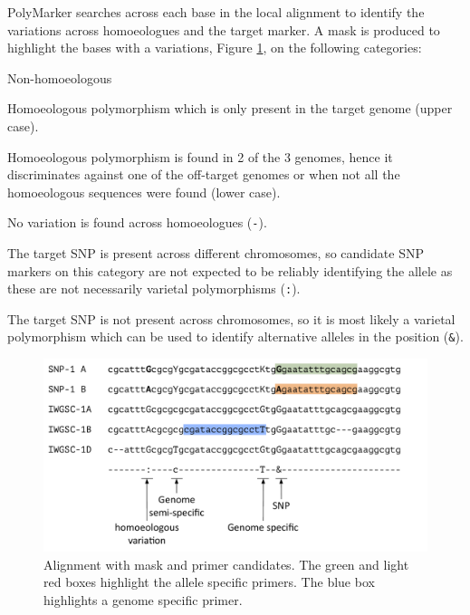 PolyMarker searches across each base in the local alignment to identify the variations across homoeologues and the target marker.
A mask is produced to highlight the bases with a variations, Figure \ref{fig:poly:mask}, on the following categories:
\begin{labeling}{Non-homoeologous}
\item [Specific] Homoeologous polymorphism which is only present in the target genome (upper case).
\item [Semi-specific] Homoeologous polymorphism is found in 2 of the 3 genomes, hence it discriminates against one of the off-target genomes or when not all the homoeologous sequences were found (lower case).
\item [Non-specific] No variation is found across homoeologues (\texttt{-}).
\item [Homoeologous] The target SNP is present across different chromosomes, so candidate SNP markers on this category are not expected to be reliably identifying the allele as these are not necessarily varietal polymorphisms (\texttt{:}).
\item [Non-homoeologous] The target SNP is not present across chromosomes, so it is most likely a varietal polymorphism which can be used to identify alternative alleles in the position (\texttt{\&}).
\end{labeling} 


\begin{figure}
\includegraphics[width=1\textwidth]{PolyMarker/Figures/aln/mask.pdf}
\caption[Alignment with mask and primer candidates.]{Alignment with mask and primer candidates. The green and light red boxes highlight the allele specific primers. The blue box highlights a genome specific primer. }
\label{fig:poly:mask}
\end{figure}

